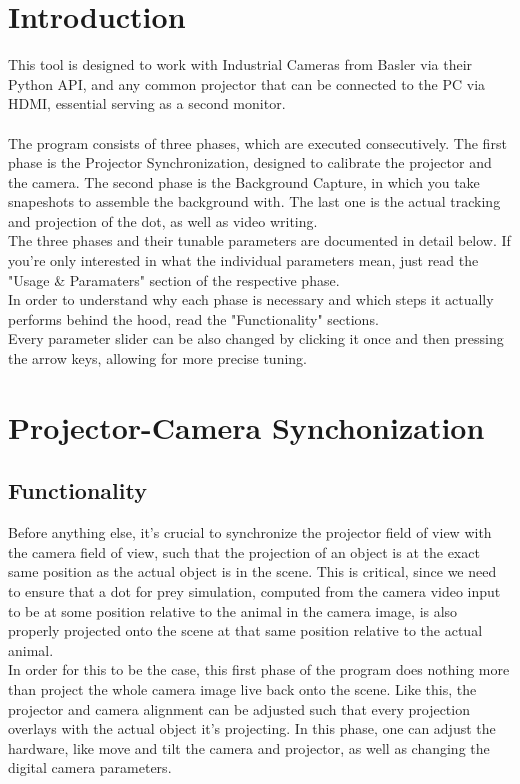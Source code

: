 \documentclass[12pt]{article}
\begin{document}
\section{Introduction}
This tool is designed to work with Industrial Cameras from Basler via their Python API, and any common projector that can be connected to the PC via HDMI, essential serving as a second monitor.\\
\\ 
The program consists of three phases, which are executed consecutively. The first phase is the Projector Synchronization, designed to calibrate the projector and the camera. The second phase is the Background Capture, in which you take snapeshots to assemble the background with. The last one is the actual tracking and projection of the dot, as well as video writing.\\
The three phases and their tunable parameters are documented in detail below. If you're only interested in what the individual parameters mean, just read the "Usage \& Paramaters" section of the respective phase.\\
In order to understand why each phase is necessary and which steps it actually performs behind the hood, read the "Functionality" sections.\\
Every parameter slider can be also changed by clicking it once and then pressing the arrow keys, allowing for more precise tuning.



\section{Projector-Camera Synchonization}

\subsection{Functionality}
Before anything else, it's crucial to synchronize the projector field of view with the camera field of view, such that the projection of an object is at the exact same position as the actual object is in the scene. This is critical, since we need to ensure that a dot for prey simulation, computed from the camera video input to be at some position relative to the animal in the camera image, is also properly projected onto the scene at that same position relative to the actual animal.\\
In order for this to be the case, this first phase of the program does nothing more than project the whole camera image live back onto the scene. Like this, the projector and camera alignment can be adjusted such that every projection overlays with the actual object it's projecting. In this phase, one can adjust the hardware, like move and tilt the camera and projector, as well as changing the digital camera parameters.
\end{document}
